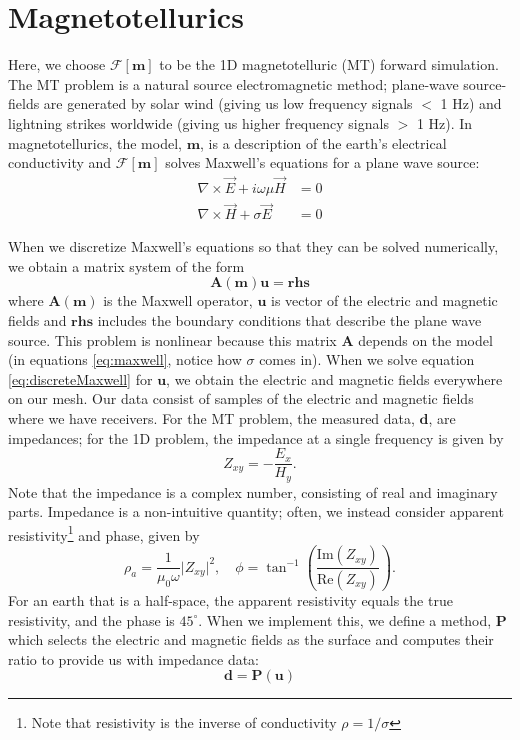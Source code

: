 \documentclass[11pt,oneside]{article}
\begin{document}
\section{Magnetotellurics}

Here, we choose $\mathcal{F}[\mathbf{m}]$ to be the 1D magnetotelluric (MT) forward simulation. The MT problem is a natural source electromagnetic method; plane-wave source-fields are generated by solar wind (giving us low frequency signals $<$ 1 Hz) and lightning strikes worldwide (giving us higher frequency signals $>$ 1 Hz). In magnetotellurics, the model, $\mathbf{m}$, is a description of the earth’s electrical conductivity and $\mathcal{F}[\mathbf{m}]$ solves Maxwell’s equations for a plane wave source:
\begin{equation}
\begin{split}
\nabla \times \vec{E} + i\omega\mu\vec{H} &= 0 \\
\nabla \times \vec{H} + \sigma\vec{E} &= 0
\end{split}
\label{eq:maxwell}
\end{equation}

When we discretize Maxwell’s equations so that they can be solved numerically, we obtain a matrix system of the form
\begin{equation}
    \mathbf{A}(\mathbf{m})\mathbf{u} = \mathbf{rhs}
    \label{eq:discreteMaxwell}
\end{equation}
where $\mathbf{A}(\mathbf{m})$ is the Maxwell operator, $\mathbf{u}$ is vector of the electric and magnetic fields and $\mathbf{rhs}$ includes the boundary conditions that describe the plane wave source. This problem is nonlinear because this matrix $\mathbf{A}$ depends on the model (in equations \ref{eq:maxwell}, notice how $\sigma$ comes in). When we solve equation \ref{eq:discreteMaxwell} for $\mathbf{u}$, we obtain the electric and magnetic fields everywhere on our mesh. Our data consist of samples of the electric and magnetic fields where we have receivers. For the MT problem, the measured data, $\mathbf{d}$, are impedances; for the 1D problem, the impedance at a single frequency is given by
\begin{equation}
Z_{xy} = -\frac{E_x}{H_y}.
\label{eq:impedance}
\end{equation}
Note that the impedance is a complex number, consisting of real and imaginary parts. Impedance is a non-intuitive quantity; often, we instead consider apparent resistivity\footnote{Note that resistivity is the inverse of conductivity $\rho = 1/\sigma$} and phase, given by
\begin{equation}
\rho_a = \frac{1}{\mu_0\omega} \big|Z_{xy}\big|^2,
\quad
\phi = \tan^{-1}\left(\frac{\text{Im}(Z_{xy})}{\text{Re}(Z_{xy})}\right).
\label{eq:rhoa_phase}
\end{equation}
For an earth that is a half-space, the apparent resistivity equals the true resistivity, and the phase is $45^{\circ}$. When we implement this, we define a method, $\mathbf{P}$ which selects the electric and magnetic fields as the surface and computes their ratio to provide us with impedance data:
\begin{equation}
    \mathbf{d} = \mathbf{P}(\mathbf{u})
\end{equation}
\end{document}
